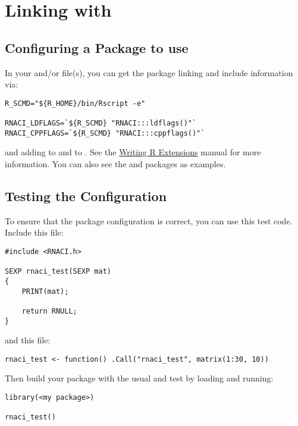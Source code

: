 \section{Linking with \thispackage}\label{linking}

\subsection{Configuring a Package to use \thispackage}
In your  and/or  file(s), you can get the 
package linking and include information via:
\begin{lstlisting}
R_SCMD="${R_HOME}/bin/Rscript -e"
 
RNACI_LDFLAGS=`${R_SCMD} "RNACI:::ldflags()"`
RNACI_CPPFLAGS=`${R_SCMD} "RNACI:::cppflags()"`
\end{lstlisting}

and adding  to  and 
 to .  See the
\href{http://cran.r-project.org/doc/manuals/R-exts.html#Configure-and-cleanup
}{Writing R Extensions} manual for more information.  You can also see the 
 and  packages as examples.



\subsection{Testing the Configuration}

To ensure that the package configuration is correct, you can use this test 
code.  Include this  file:
\begin{lstlisting}[title=rnaci\_test.c]
#include <RNACI.h>

SEXP rnaci_test(SEXP mat)
{
	PRINT(mat);
	
	return RNULL;
}
\end{lstlisting}

and this  file:
\begin{lstlisting}[language=rr,title=rnaci\_test.r]
rnaci_test <- function() .Call("rnaci_test", matrix(1:30, 10))
\end{lstlisting}

Then build your package with the usual  and test by loading 
 and running:
\begin{lstlisting}[language=rr]
library(<my package>)

rnaci_test()
\end{lstlisting}
